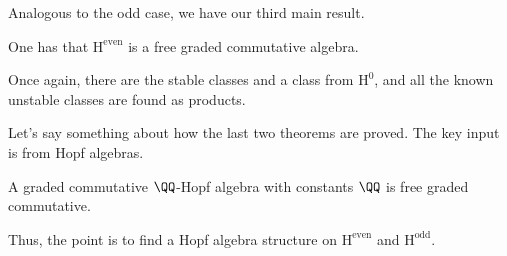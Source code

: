 \documentclass{article}
\begin{document}
Analogous to the odd case, we have our third main result.
\begin{theorem}
	One has that $\mathrm H^{\mathrm{even}}$ is a free graded commutative algebra.
\end{theorem}
Once again, there are the stable classes and a class from $\mathrm H^0$, and all the known unstable classes are found as products.

Let's say something about how the last two theorems are proved. The key input is from Hopf algebras.
\begin{theorem}[Leray]
	A graded commutative $\QQ$-Hopf algebra with constants $\QQ$ is free graded commutative.
\end{theorem}
Thus, the point is to find a Hopf algebra structure on $\mathrm H^{\mathrm{even}}$ and $\mathrm H^{\mathrm{odd}}$.
\end{document}
